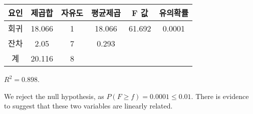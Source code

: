 \documentclass{article}
\begin{document}
\begin{center}
\begin{tabular}{c|ccccc}
	요인 & 제곱합 & 자유도 & 평균제곱 & F 값 & 유의확률 \\
	\hline
	회귀 & 18.066 & 1 & 18.066 & 61.692 & 0.0001 \\
	잔차 & 2.05   & 7 & 0.293  & \\
	\hline
	계   & 20.116 & 8 \\
\end{tabular}
\end{center}

$R^2 = 0.898$.

We reject the null hypothesis, as $P(F \ge f) = 0.0001 \le 0.01$. There is
evidence to suggest that these two variables are linearly related.
\end{document}
